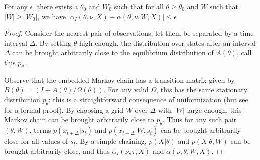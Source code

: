 \begin{lemma}
For any $\epsilon$, there exists a $\theta_0$ and $W_0$ such that for all 
$\theta \ge \theta_0$ and $W$ such that $|W|\ge|W_0|$, we have 
$|\alpha_I(\theta,\nu,X) - \alpha(\theta,\nu,W,X)| \le \epsilon$
\end{lemma}
\begin{proof}
  Consider the nearest pair of observations, let them be separated by a
  time interval $\Delta$. By setting $\theta$ high enough, the
  distribution over states after an interval $\Delta$ can be brought 
  arbitrarily close to the equilibrium distribution of $A(\theta)$, call
  this $p_{\theta}$.

  Observe that the embedded Markov chain has a transition matrix given
  by $B(\theta) = (I + A(\theta)/\Omega(\theta))$. For any valid
  $\Omega$, this has the same stationary distribution $p_{\theta}$:
  this is a straightforward consequence of uniformization (but see~\cite{}
  for a formal proof). By choosing a grid $W$ over $\Delta$ with $|W|$
  large enough, this Markov chain can be brought arbitrarily close to
  $p_{\theta}$. Thus for any such pair $(\theta,W)$, terms 
  $p(x_{t+\Delta}|s_t)$ and $p(x_{t+\Delta}|W,s_t)$ can be brought
  arbitrarily close for all values of $s_t$. By a simple chaining,
  $p(X|\theta)$ and $p(X|\theta,W)$ can be brought arbitrarily close, and
  thus $\alpha_I(\nu,\tau,X)$ and $\alpha(\nu,\theta,W,X)$.
\end{proof}

